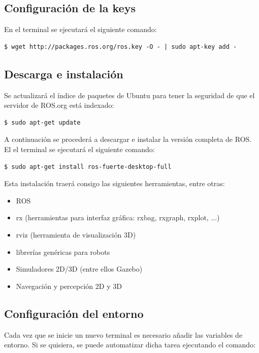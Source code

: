 \documentclass[10pt, a4paper]{report}
\begin{document}
\subsection{Configuración de la keys}

En el terminal se ejecutará el siguiente comando:

\begin{verbatim}
$ wget http://packages.ros.org/ros.key -O - | sudo apt-key add -
\end{verbatim}

\subsection{Descarga e instalación}

Se actualizará el índice de paquetes de Ubuntu para tener la seguridad de que el servidor de ROS.org está indexado:

\begin{verbatim}
$ sudo apt-get update
\end{verbatim}

A continuación se procederá a descargar e instalar la versión completa de ROS. El el terminal se ejecutará el siguiente comando:

\begin{verbatim}
$ sudo apt-get install ros-fuerte-desktop-full
\end{verbatim}

Esta instalación traerá consigo las siguientes herramientas, entre otras:

\begin{itemize}
\item ROS
\item rx (herramientas para interfaz gráfica: rxbag,  rxgraph, rxplot, ...)
\item rviz (herramienta de visualización 3D)
\item librerías genéricas para robots
\item Simuladores 2D/3D (entre ellos Gazebo)
\item Navegación y percepción 2D y 3D
\end{itemize}

\subsection{Configuración del entorno}

Cada vez que se inicie un nuevo terminal es necesario añadir las variables de entorno. Si se quisiera, se puede automatizar dicha tarea ejecutando el comando:
\end{document}
